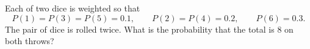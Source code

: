 Each of two dice is weighted so that
\[
P(1)=P(3)=P(5)=0.1,\qquad P(2)=P(4)=0.2,\qquad P(6)=0.3 .
\]
The pair of dice is rolled twice. What is the probability that the total is $8$ on both throws?
